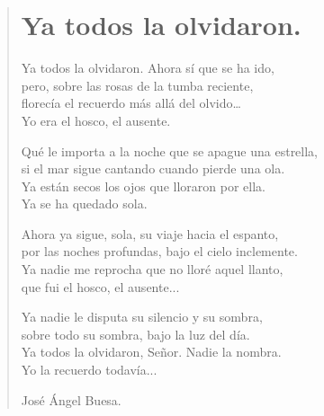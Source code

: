 \documentclass[11pt, portrait, twoside, notitlepage, openright]{book}
\begin{document}
\newpage
\begin{verse}
\begin{center}
\section{Ya todos la olvidaron.}
\end{center}
Ya todos la olvidaron. Ahora sí que se ha ido,\\
pero, sobre las rosas de la tumba reciente,\\
florecía el recuerdo más allá del olvido…\\
Yo era el hosco, el ausente.
\newline

Qué le importa a la noche que se apague una estrella,\\
si el mar sigue cantando cuando pierde una ola.\\
Ya están secos los ojos que lloraron por ella.\\
Ya se ha quedado sola.
\newline

Ahora ya sigue, sola, su viaje hacia el espanto,\\
por las noches profundas, bajo el cielo inclemente.\\
Ya nadie me reprocha que no lloré aquel llanto,\\
que fui el hosco, el ausente...
\newline

Ya nadie le disputa su silencio y su sombra,\\
sobre todo su sombra, bajo la luz del día.\\
Ya todos la olvidaron, Señor. Nadie la nombra.\\
Yo la recuerdo todavía...
\newline

José Ángel Buesa.
\end{verse}
\end{document}
